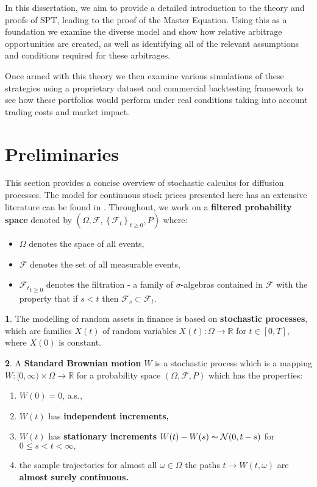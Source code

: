\documentclass[british]{amsart} \usepackage{lmodern}
\numberwithin{equation}{section} \numberwithin{figure}{section}
\theoremstyle{plain} \newtheorem{thm}{\protect\theoremname}[section]
\theoremstyle{definition} \newtheorem{defn}[thm]{\protect\definitionname}
\theoremstyle{plain} \newtheorem{assumption}[thm]{\protect\assumptionname}
\theoremstyle{plain} \newtheorem{lem}[thm]{\protect\lemmaname}
\theoremstyle{plain} \newtheorem{prop}[thm]{\protect\propositionname}
\theoremstyle{remark} \newtheorem{rem}[thm]{\protect\remarkname}
\theoremstyle{plain} \newtheorem{cor}[thm]{\protect\corollaryname}
\begin{document}
In this dissertation, we aim to provide a detailed introduction to the theory
and proofs of SPT, leading to the proof of the Master Equation. Using this as a
foundation we examine the diverse model and show how relative arbitrage
opportunities are created, as well as identifying all of the relevant
assumptions and conditions required for these arbitrages.

Once armed with this theory we then examine various simulations of these
strategies using a proprietary dataset and commercial backtesting framework to
see how these portfolios would perform under real conditions taking into account
trading costs and market impact.



\section{Preliminaries}

This section provides a concise overview of stochastic calculus for
diffusion processes. The model for continuous stock prices presented
here has an extensive literature can be found in \cite{shreve1991}.
Throughout, we work on a \textbf{filtered probability space} denoted
by $(\Omega,\mathcal{F},\left\{ \mathcal{F}_{t}\right\} _{t\ge0},P)$
where:
\begin{itemize}
\item $\Omega$ denotes the space of all events,
\item $\mathcal{F}$ denotes the set of all measurable events,
\item ${ \mathcal{F}_{t}} _{t\ge0}$ denotes the filtration
- a family of $\sigma$-algebras contained in $\mathcal{F}$ with
the property that if $s<t$ then $\mathcal{F}_{s}\subset\mathcal{F}_{t}$. 
\end{itemize}
\begin{defn}
The modelling of random assets in finance is based on \textbf{stochastic
processes}, which are families $X(t)$  of random variables $X(t):\Omega\to\mathbb{R}$
for $t\in[0,T]$, where $X(0)$ is constant.
\end{defn}

\begin{defn}
A \textbf{Standard Brownian motion} $W$ is a stochastic process which
is a mapping $W:[0,\infty)\times\Omega\to\mathbb{R}$ for a probability
space $(\Omega,\mathcal{F},P)$ which has the properties:
\begin{enumerate}
\item $W(0)=0$, a.s.,
\item $W(t)$ has \textbf{independent increments,}
\item $W(t)$ has \textbf{stationary increments} $W(t)-W(s)\thicksim\mathcal{N}(0,t-s)$
for $0\le s<t<\infty,$
\item the sample trajectories for almost all $\omega\in\Omega$ the paths
$t\to W(t,\omega)$ are \textbf{almost surely continuous.}
\end{enumerate}
\end{defn}
\end{document}
